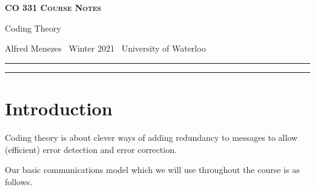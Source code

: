\documentclass[10pt]{article}
\newcommand{\newtitle}[4]{
  \begin{center}
	\huge{\textbf{\textsc{#1 Course Notes}}}
    
	\large{\sc #2}
    
	{\sc #3 \textbullet\, #4 \textbullet\, University of Waterloo}
	\normalsize\vspace{1cm}\hrule
  \end{center}
}
\theoremstyle{newstyle}
\begin{document}
\pagestyle{fancy}
\newtitle{CO 331}{Coding Theory}{Alfred Menezes}{Winter 2021}

\tableofcontents
\vspace{1cm}\hrule
\fancyhead[R]{\nouppercase\rightmark}
\newpage 
{}

\section{Introduction}

Coding theory is about clever ways of adding redundancy to messages to allow (efficient) error 
detection and error correction. 

Our basic communications model which we will use throughout the course is as follows.

\end{document}
